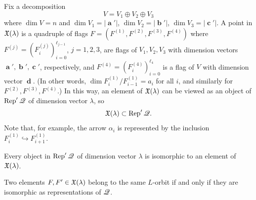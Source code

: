 \documentclass[12pt,reqno]{amsart}
\begin{document}
Fix a decomposition
$$
V=V_1\oplus V_2\oplus V_3
$$
where
$ \dim V=n $ and
$ \dim V_1 = |\mbfa'| $, $ \dim V_2 = |\mbfb'| $,
$ \dim V_3 = |\mbfc'| $.
A point in $ \mathfrak{X}(\lambda) $
is a quadruple of flags
$ F = ( F^{(1)}, F^{(2)}, F^{(3)}, F^{(4)} ) $
where
$ F^{(j)} = ( F^{(j)}_i )_{i=0}^{\ell_{j-1}} $,
$j=1,2,3$, are flags of $ V_1,V_2,V_3 $ with dimension vectors $\mbfa',\mbfb',\mbfc'$, respectively, and $ F^{(4)} = ( F^{(4)}_i )_{i=0}^{\ell_4} $
is a flag of $V$ with dimension vector $ \mbfd $.
(In other words,
$ \dim F^{(1)}_i / F^{(1)}_{i-1} = a_i $ for all $i$, and similarly for $F^{(2)},F^{(3)},F^{(4)}$.)
In this way, an element of $\mathfrak{X}(\lambda)$
can be viewed as an object of $\Rep'\quiver$
of dimension vector $\lambda$,
so
$$
\Xfv(\lambda)\subset\Rep'\quiver.
$$
%
Note that, for example, the arrow $ \alpha_i $ is represented by the inclusion
$ F_i^{(1)} \hookrightarrow F_{i + 1}^{(1)} $.

\begin{proposition}\label{proposition:orbits.in.xfv.and.RepQ'}
\begin{penumerate}
\item
Every object in $ \Rep'\quiver $ of dimension vector $\lambda$
is isomorphic to an element of $ \mathfrak{X}(\lambda)$.
\item
Two elements $ F,F'\in\mathfrak{X}(\lambda) $ belong to the same $L$-orbit if and only if they are isomorphic
as representations of $\mathscr{Q}$.
\end{penumerate}
\end{proposition}
\end{document}
